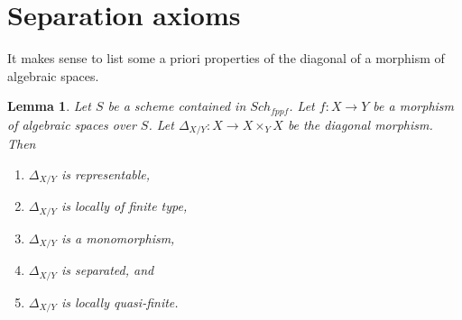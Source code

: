 \documentclass{stacks-project}
\theoremstyle{plain}
\newtheorem{lemma}[subsection]{Lemma}
\theoremstyle{definition}
\theoremstyle{remark}
\numberwithin{equation}{subsection}
\def\Sch{\mathit{Sch}}
\begin{document}
\section{Separation axioms}
\label{section-separation-axioms}

\noindent
It makes sense to list some a priori properties of the diagonal of
a morphism of algebraic spaces.

\begin{lemma}
\label{lemma-properties-diagonal}
Let $S$ be a scheme contained in $\Sch_{fppf}$.
Let $f : X \to Y$ be a morphism of algebraic spaces over $S$.
Let $\Delta_{X/Y} : X \to X \times_Y X$ be the diagonal morphism.
Then
\begin{enumerate}
\item $\Delta_{X/Y}$ is representable,
\item $\Delta_{X/Y}$ is locally of finite type,
\item $\Delta_{X/Y}$ is a monomorphism,
\item $\Delta_{X/Y}$ is separated, and
\item $\Delta_{X/Y}$ is locally quasi-finite.
\end{enumerate}
\end{lemma}
\end{document}
